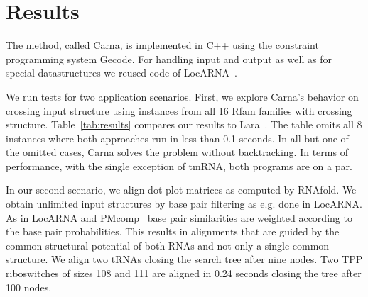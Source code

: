 \documentclass{easychair}
\begin{document}

\section{Results}

The method, called Carna, is implemented in C++ using the constraint
programming system Gecode. For handling input and output as well as
for special datastructures we reused code of
LocARNA~\cite{Will:etal:_infer_non_codin_rna_famil:PLOS2007}.

We run tests for two application scenarios. First, we explore Carna's
behavior on crossing input structure using instances from all 16 Rfam
families with crossing structure. Table~\ref{tab:results} compares our
results to Lara~\cite{Bauer:Klau:Reinert:Accur_multi_seque:2007}. The
table omits all 8 instances where both approaches run in less than 0.1
seconds.  In all but one of the omitted cases, Carna solves the
problem without backtracking. In terms of performance, with the single
exception of tmRNA, both programs are on a par.
%

In our second scenario, we align dot-plot matrices as computed by
RNAfold\cite{Hofacker:Fontana:Stadler:Bonhoeffer:Tacker:Schuster:MonChem1994}. We
obtain unlimited input structures by base pair filtering as e.g. done
in LocARNA. As in LocARNA and
PMcomp~\cite{Hofacker:Bernhart:Stadler:Align_RNA_base:2004} base pair
similarities are weighted according to the base pair
probabilities. This results in alignments that are guided by the
common structural potential of both RNAs and not only a single common
structure. We align two tRNAs closing the search tree after nine
nodes. Two TPP riboswitches of sizes 108 and 111 are aligned in 0.24
seconds closing the tree after 100 nodes.
\end{document}
